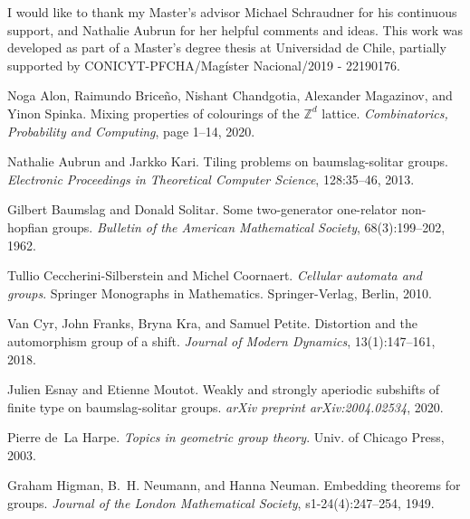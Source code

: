 \documentclass[cupthm,crop,info]{CUP-JNL-ETS}%
\theoremstyle{cupplain}
\theoremstyle{cupdefinition}
\theoremstyle{cupremark}
\theoremstyle{cupproof}
\numberwithin{equation}{section}
\begin{document}
\begin{Backmatter}

\begin{ack}
I would like to thank my Master's advisor Michael Schraudner for his continuous support, and Nathalie Aubrun for her helpful comments and ideas. This work was developed as part of a Master's degree thesis at Universidad de Chile, partially supported by CONICYT-PFCHA/Mag\'ister Nacional/2019 - 22190176.
\end{ack}

\newcommand{\etalchar}[1]{$^{#1}$}

\begin{thebibliography}{10}

	
Noga Alon, Raimundo Brice{\~n}o, Nishant Chandgotia, Alexander Magazinov, and
Yinon Spinka. Mixing properties of colourings of the {$\mathbb{Z}^{d}$} lattice. {\em Combinatorics, Probability and Computing}, page 1–14, 2020.

	Nathalie Aubrun and Jarkko Kari.
Tiling problems on baumslag-solitar groups. {\em Electronic Proceedings in Theoretical Computer Science}, 128:35–46, 2013.

	

	Gilbert Baumslag and Donald Solitar.
Some two-generator one-relator non-hopfian groups.
 {\em Bulletin of the American Mathematical Society}, 68(3):199–202, 1962.

Tullio Ceccherini-Silberstein and Michel Coornaert.
 {\em Cellular automata and groups}.
 Springer Monographs in Mathematics. Springer-Verlag, Berlin, 2010.

Van Cyr, John Franks, Bryna Kra, and Samuel Petite. Distortion and the automorphism group of a shift. {\em Journal of Modern Dynamics}, 13(1):147–161, 2018.

	Julien Esnay and Etienne Moutot.
Weakly and strongly aperiodic subshifts of finite type on baumslag-solitar groups. {\em arXiv preprint  arXiv:2004.02534}, 2020.

Pierre de~La Harpe. {\em Topics in geometric group theory}. Univ. of Chicago Press, 2003.

	

	Graham Higman, B.~H. Neumann, and Hanna Neuman. Embedding theorems for groups.
{\em Journal of the London Mathematical Society}, s1-24(4):247--254, 1949.


\end{thebibliography}
\end{Backmatter}
\end{document}
